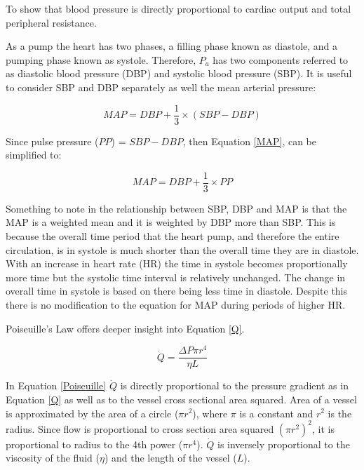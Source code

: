 To show that blood pressure is directly proportional to cardiac output and total peripheral resistance. 

As a pump the heart has two phases, a filling phase known as diastole, and a pumping phase known as systole. Therefore, $P_{a}$ has two components referred to as diastolic blood pressure (DBP) and systolic blood pressure (SBP). It is useful to consider SBP and DBP separately as well the mean arterial pressure:

\begin{equation}
    MAP = DBP + \frac{1}{3} \times (SBP - DBP)
    \label{MAP1}
\end{equation}

Since pulse pressure ($PP$) = $SBP - DBP$, then Equation \ref{MAP}, can be simplified to:

\begin{equation}
    MAP = DBP + \frac{1}{3} \times PP
    \label{MAP_simplified}
\end{equation}

Something to note in the relationship between SBP, DBP and MAP is that the MAP is a weighted mean and it is weighted by DBP more than SBP. This is because the overall time period that the heart pump, and therefore the entire circulation, is in systole is much shorter than the overall time they are in diastole. With an increase in heart rate (HR) the time in systole becomes proportionally more time but the systolic time interval is relatively unchanged. The change in overall time in systole is based on there being less time in diastole. Despite this there is no modification to the equation for MAP during periods of higher HR.

Poiseuille's Law offers deeper insight into Equation \ref{Q}.

\begin{equation}
    \dot{Q} = \frac{\Delta P \pi r^4}{\eta L}
    \label{Poiseuille}
\end{equation}

In Equation \ref{Poiseuille} $\dot{Q}$ is directly proportional to the pressure gradient as in Equation \ref{Q} as well as to the vessel cross sectional area squared. Area of a vessel is approximated by the area of a circle ($\pi r^2$), where $\pi$ is a constant and $r^2$ is the radius. Since flow is proportional to cross section area squared $(\pi r^2)^2$, it is proportional to radius to the 4th power ($\pi r^4$). $\dot{Q}$ is inversely proportional to the viscosity of the fluid ($\eta$) and the length of the vessel ($L$). 

